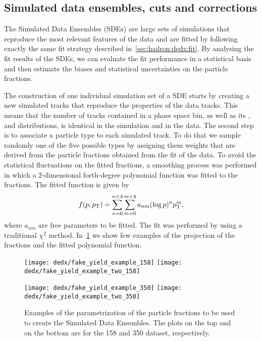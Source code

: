 \subsection{Simulated data ensembles, cuts and corrections}
\label{sec:hadron:dedx:sde}



The Simulated Data Ensembles (SDEs) are large sets of
simulations that reproduce the most relevant
features of the data and are fitted by following
exactly the same fit strategy described in~\cref{sec:hadron:dedx:fit}.
By analysing the fit results of the SDEs, we can evaluate the fit
performance in a statistical basis and then estimate the biases
and statistical uncertainties on the particle fractions. 

The construction of one individual simulation set of a SDE starts
by creating a new simulated tracks that reproduce the
properties of the data tracks. This means that the number of
tracks contained in a phase space bin, as well as its \pp, \pT and
\ncl distributions, is identical in the simulation and in the data.
The second step is to associate a particle type to each simulated track.
To do that we sample randomly one of the five possible types
by assigning them weights that are derived from the particle fractions
obtained from the \dedx fit of the data.
To avoid the statistical fluctuations on the fitted fractions,
a smoothing process was performed in which a 2-dimensional
forth-degree polynomial function was fitted to the fractions.
The fitted function is given by
\begin{equation}
  f(p,p_\text{T}) = \sum_{n=0}^{n<4} \sum_{m=0}^{m<4} a_{nm} (\log p)^n p_\text{T}^m,
  \label{eq:hadron:dedx:pol}
\end{equation}
where $a_{nm}$ are free parameters to be fitted.
The fit was performed by using a traditional $\chi^2$ method.
In~\cref{fig:hadron:dedx:fit:fakeyield} we show few examples
of the \pT projection of the fractions and the fitted
polynomial function. 


\begin{figure}[!ht]
  \centering
  \texttt{[image: dedx/fake\_yield\_example\_158]}
  \texttt{[image: dedx/fake\_yield\_example\_two\_158]}

  \vspace{0.5cm}
  
  \texttt{[image: dedx/fake\_yield\_example\_350]}
  \texttt{[image: dedx/fake\_yield\_example\_two\_350]}

  \caption{Examples of the parametrization of the particle fractions to be used to create the Simulated Data Ensembles. The plots on the top and on the bottom are for the 158 and 350 \GeVc dataset, respectively.}
  \label{fig:hadron:dedx:fit:fakeyield}
\end{figure}


